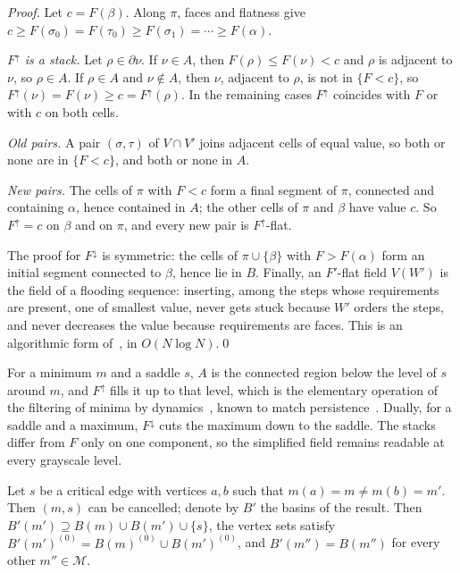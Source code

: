 \documentclass[runningheads]{llncs}
\newcommand{\Fup}{F^{\uparrow}}
\newcommand{\Fdown}{F^{\downarrow}}
\begin{document}
\begin{proof}
Let $c=F(\beta)$. Along $\pi$, faces and flatness give
$c\ge F(\sigma_0)=F(\tau_0)\ge F(\sigma_1)=\cdots\ge F(\alpha)$.

\emph{$\Fup$ is a stack.} Let $\rho\in\partial\nu$. If $\nu\in A$, then
$F(\rho)\le F(\nu)<c$ and $\rho$ is adjacent to $\nu$, so $\rho\in A$. If
$\rho\in A$ and $\nu\notin A$, then $\nu$, adjacent to $\rho$, is not in
$\{F<c\}$, so $\Fup(\nu)=F(\nu)\ge c=\Fup(\rho)$. In the remaining cases
$\Fup$ coincides with $F$ or with $c$ on both cells.

\emph{Old pairs.} A pair $(\sigma,\tau)$ of $V\cap V'$ joins adjacent cells
of equal value, so both or none are in $\{F<c\}$, and both or none in $A$.

\emph{New pairs.} The cells of $\pi$ with $F<c$ form a final segment of
$\pi$, connected and containing $\alpha$, hence contained in $A$; the other
cells of $\pi$ and $\beta$ have value $c$. So $\Fup=c$ on $\beta$ and on
$\pi$, and every new pair is $\Fup$-flat.

The proof for $\Fdown$ is symmetric: the cells of $\pi\cup\{\beta\}$ with
$F>F(\alpha)$ form an initial segment connected to $\beta$, hence lie in
$B$. Finally, an $F'$-flat field $V(W')$ is the field of a flooding
sequence: inserting, among the steps whose requirements are present, one
of smallest value, never gets stuck because $W'$ orders the steps, and
never decreases the value because requirements are faces. This is an
algorithmic form of~\cite[Th.~4.1]{Ber25b}, in $O(N\log N)$.\qed
\end{proof}

For a minimum $m$ and a saddle $s$, $A$ is the connected region below the
level of $s$ around $m$, and $\Fup$ fills it up to that level, which is the
elementary operation of the filtering of minima by
dynamics~\cite{Grimaud92}, known to match persistence~\cite{BNG22,ELZ02}.
Dually, for a saddle and a maximum, $\Fdown$ cuts the maximum down to the
saddle. The stacks differ from $F$ only on one component, so the
simplified field remains readable at every grayscale level.

\begin{proposition}[Merging]\label{prop:merge}
Let $s$ be a critical edge with vertices $a,b$ such that $m(a)=m\ne m(b)=m'$.
Then $(m,s)$ can be cancelled; denote by $B'$ the basins of the result.
Then $B'(m')\supseteq B(m)\cup B(m')\cup\{s\}$, the vertex sets satisfy
$B'(m')^{(0)}=B(m)^{(0)}\cup B(m')^{(0)}$, and $B'(m'')=B(m'')$ for every
other $m''\in\mathcal{M}$.
\end{proposition}
\end{document}
